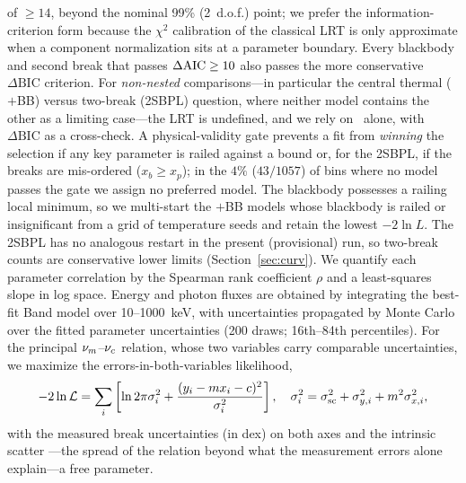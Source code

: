 \citep{Wilks1938} of $\ge$$14$, beyond the nominal 99\% (2~d.o.f.) point; we
prefer the information-criterion form because the $\chi^2$ calibration of the
classical LRT is only approximate when a component normalization sits at a
parameter boundary. Every blackbody and second break that passes $\Delta\mathrm{AIC}\ge10$
also passes the more conservative $\Delta\mathrm{BIC}$ criterion. For
\emph{non-nested} comparisons---in particular the central thermal
($+$BB) versus two-break (2SBPL) question, where neither model contains the
other as a limiting case---the LRT is undefined, and we rely
on \daic\ alone, with $\Delta\mathrm{BIC}$ as a cross-check. A physical-validity
gate prevents a fit from \emph{winning} the selection if any key parameter is
railed against a bound or, for the 2SBPL, if the breaks are mis-ordered
($x_b\ge x_p$); in the $4\%$ ($43/1057$) of bins where no model passes the gate
we assign no preferred model. The blackbody possesses a railing local minimum,
so we multi-start the $+$BB models whose blackbody is railed or insignificant
from a grid of temperature seeds and retain the lowest $-2\ln L$. The 2SBPL has
no analogous restart in the present (provisional) run, so two-break counts are
conservative lower limits (Section~\ref{sec:curv}). We quantify each parameter
correlation by the Spearman rank coefficient $\rho$ and a least-squares slope in
log space. Energy and photon fluxes are obtained by integrating the best-fit
Band model over 10--1000~keV, with uncertainties propagated by Monte Carlo over
the fitted parameter uncertainties (200 draws; 16th--84th percentiles). For the
principal $\nu_m$--$\nu_c$ relation, whose two variables carry comparable
uncertainties, we maximize the \citet{DAgostini2005} errors-in-both-variables
likelihood,
\begin{equation}
-2\ln\mathcal{L}=\sum_i\left[\ln 2\pi\sigma_i^2
+\frac{(y_i-m x_i-c)^2}{\sigma_i^2}\right],\quad
\sigma_i^2=\sigma_{\rm sc}^2+\sigma_{y,i}^2+m^2\sigma_{x,i}^2,
\label{eq:dagostini}
\end{equation}
with the measured break uncertainties (in dex) on both axes and the intrinsic
scatter \ssc---the spread of the relation beyond what the measurement errors
alone explain---a free parameter.

